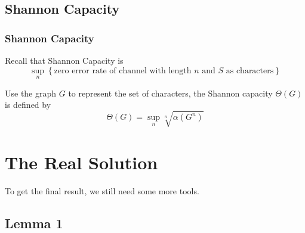 \documentclass{beamer}
\begin{document}
            \subsection{Shannon Capacity}

                  \begin{frame}
                        \frametitle{Shannon Capacity}
                        \begin{definition}\label{def:shannonCapacity}
                              Recall that Shannon Capacity is 
                              \begin{equation}
                                    \sup_{n} \left\{
                                          \text{zero error rate of channel with length $n$ and $S$ as characters}
                                    \right\}
                              \end{equation}

                              Use the graph $G$ to represent the set of characters, the Shannon capacity $ \Theta(G) $ is defined by
                              \begin{equation}
                                    \Theta(G) = \sup_{n} \sqrt[n]{\alpha(G^n)} 
                              \end{equation}

                        \end{definition}
                  \end{frame}

      \section{The Real Solution}

                  \begin{frame}
                        To get the final result, we still need some more tools.
                  \end{frame}

            \subsection{Lemma 1}
\end{document}
